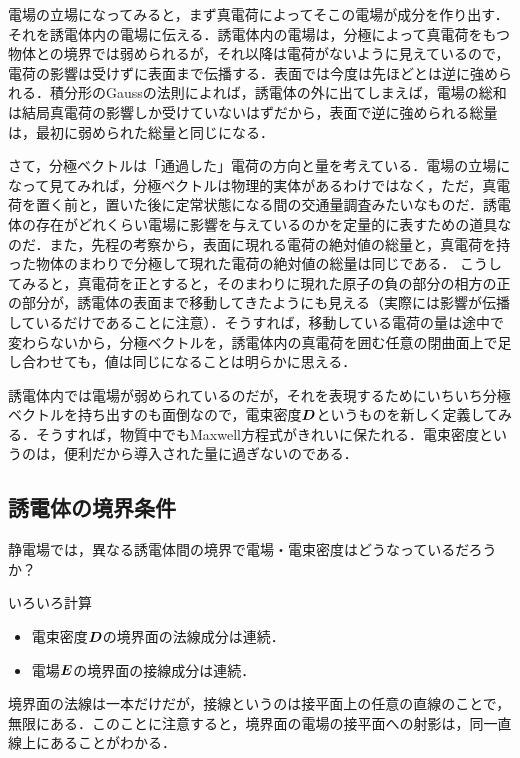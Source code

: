 \documentclass[a4paper,10pt,uplatex]{jsarticle}
\newcommand{\E}{\vb*{E}}
\newcommand{\D}{\vb*{D}}
\begin{document}
電場の立場になってみると，まず真電荷によってそこの電場が成分を作り出す．それを誘電体内の電場に伝える．誘電体内の電場は，分極によって真電荷をもつ物体との境界では弱められるが，それ以降は電荷がないように見えているので，電荷の影響は受けずに表面まで伝播する．表面では今度は先ほどとは逆に強められる．積分形のGaussの法則によれば，誘電体の外に出てしまえば，電場の総和は結局真電荷の影響しか受けていないはずだから，表面で逆に強められる総量は，最初に弱められた総量と同じになる．

さて，分極ベクトルは「通過した」電荷の方向と量を考えている．電場の立場になって見てみれば，分極ベクトルは物理的実体があるわけではなく，ただ，真電荷を置く前と，置いた後に定常状態になる間の交通量調査みたいなものだ．誘電体の存在がどれくらい電場に影響を与えているのかを定量的に表すための道具なのだ．また，先程の考察から，表面に現れる電荷の絶対値の総量と，真電荷を持った物体のまわりで分極して現れた電荷の絶対値の総量は同じである．
こうしてみると，真電荷を正とすると，そのまわりに現れた原子の負の部分の相方の正の部分が，誘電体の表面まで移動してきたようにも見える（実際には影響が伝播しているだけであることに注意）．そうすれば，移動している電荷の量は途中で変わらないから，分極ベクトルを，誘電体内の真電荷を囲む任意の閉曲面上で足し合わせても，値は同じになることは明らかに思える．

誘電体内では電場が弱められているのだが，それを表現するためにいちいち分極ベクトルを持ち出すのも面倒なので，電束密度$\D$というものを新しく定義してみる．そうすれば，物質中でもMaxwell方程式がきれいに保たれる．電束密度というのは，便利だから導入された量に過ぎないのである．

\subsection{誘電体の境界条件}
静電場では，異なる誘電体間の境界で電場・電束密度はどうなっているだろうか？

\begin{center}
    いろいろ計算
\end{center}

\begin{itemize}
    \item 電束密度$\D$の境界面の法線成分は連続．
    \item 電場$\E$の境界面の接線成分は連続．
\end{itemize}
境界面の法線は一本だけだが，接線というのは接平面上の任意の直線のことで，無限にある．このことに注意すると，境界面の電場の接平面への射影は，同一直線上にあることがわかる．
\end{document}
